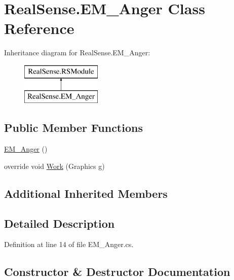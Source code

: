 \hypertarget{class_real_sense_1_1_e_m___anger}{}\section{Real\+Sense.\+E\+M\+\_\+\+Anger Class Reference}
\label{class_real_sense_1_1_e_m___anger}
Inheritance diagram for Real\+Sense.\+E\+M\+\_\+\+Anger\+:\begin{figure}[H]
\begin{center}
\leavevmode
\includegraphics[height=2.000000cm]{class_real_sense_1_1_e_m___anger}
\end{center}
\end{figure}
\subsection*{Public Member Functions}
\begin{DoxyCompactItemize}
\item 
\hyperlink{class_real_sense_1_1_e_m___anger_a843c377f0f47a7e016968dbccdcbc819}{E\+M\+\_\+\+Anger} ()
\item 
override void \hyperlink{class_real_sense_1_1_e_m___anger_a5c1f3b6b7e84ee926869828a3cfe532a}{Work} (Graphics g)
\end{DoxyCompactItemize}
\subsection*{Additional Inherited Members}


\subsection{Detailed Description}


Definition at line 14 of file E\+M\+\_\+\+Anger.\+cs.



\subsection{Constructor \& Destructor Documentation}
\mbox{\label{class_real_sense_1_1_e_m___anger_a843c377f0f47a7e016968dbccdcbc819}} 
